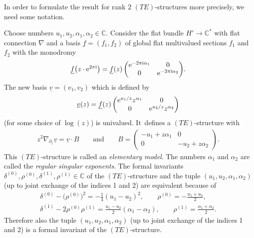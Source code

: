 \documentclass[pdftex]{sigma}%
\numberwithin{equation}{section}
\numberwithin{figure}{section}
\newcommand{\C}{{\mathbb C}}
\newcommand{\uuuu}{\underline}
\newcommand{\paa}{\partial}
\newcommand{\nnn}{\nabla}
\begin{document}
In order to formulate the result for rank $2$ $(TE)$-structures
more precisely, we need some notation.

\begin{Definition}\label{t4.4}
Choose numbers $u_1,u_2,\alpha_1,\alpha_2\in\C$.
Consider the flat bundle $H'\to\C^*$ with flat connection
$\nnn$ and a basis $\uuuu{f}=(f_1,f_2)$
of global flat multivalued sections $f_1$ and $f_2$
with the monodromy
\begin{gather*}%
\uuuu{f}\big(z\cdot {\rm e}^{2\pi {\rm i}}\big)= \uuuu{f}(z)
\begin{pmatrix}{\rm e}^{-2\pi {\rm i} \alpha_1} & 0 \\
0 & {\rm e}^{-2\pi {\rm i} \alpha_2} \end{pmatrix}\!.
\end{gather*}
The new basis $\uuuu{v}=(v_1,v_2)$ which is defined by
\begin{gather*}%
\uuuu{v}(z)= \uuuu{f}(z)
\begin{pmatrix}{\rm e}^{u_1/z}z^{\alpha_1} & 0 \\
0 & {\rm e}^{u_2/z}z^{\alpha_2}\end{pmatrix}
\end{gather*}
(for some choice of $\log(z)$) is univalued. It~defines a $(TE)$-structure with
\begin{gather*}%
z^2\nnn_{\paa_z}\uuuu{v}=\uuuu{v}\cdot B
\qquad\text{and}\qquad
B=\begin{pmatrix}-u_1+ z\alpha_1 & 0 \\
0 & -u_2+z\alpha_2\end{pmatrix}\!.
\end{gather*}
This $(TE)$-structure is called an {\it elementary model}.
The numbers $\alpha_1$ and $\alpha_2$ are called
the {\it regular singular exponents}.
The formal invariants
$\delta^{(0)},\rho^{(0)},\delta^{(1)},\rho^{(1)}\in\C$
of the $(TE)$-structure and the tuple
$(u_1,u_2,\alpha_1,\alpha_2)$ (up to joint exchange of the indices 1 and 2) are equivalent because of
\begin{gather}\label{4.6}
\delta^{(0)}-\big(\rho^{(0)}\big)^2= -\frac{1}{4}(u_1-u_2)^2,\qquad
\rho^{(0)}=-\frac{u_1+u_2}{2},
\\
\delta^{(1)}-2\rho^{(0)}\rho^{(1)}=\frac{u_1-u_2}{2}(\alpha_1-\alpha_2),\qquad
\rho^{(1)}=\frac{\alpha_1+\alpha_2}{2}.\label{4.7}
\end{gather}
Therefore also the tuple $(u_1,u_2,\alpha_1,\alpha_2)$
(up to joint exchange of the indices 1 and 2)
is a formal invariant of the $(TE)$-structure.
\end{Definition}
\end{document}
